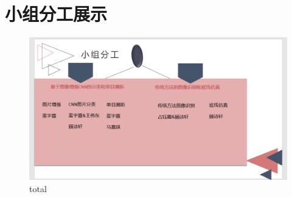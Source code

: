 \documentclass[12pt]{report}
\begin{document}
\section{小组分工展示}
\begin{figure}[h]
  \center
  \includegraphics[scale=0.4]{re1.png} %
  \caption{total} %
  \label{Distance} %
\end{figure}
\end{document}
